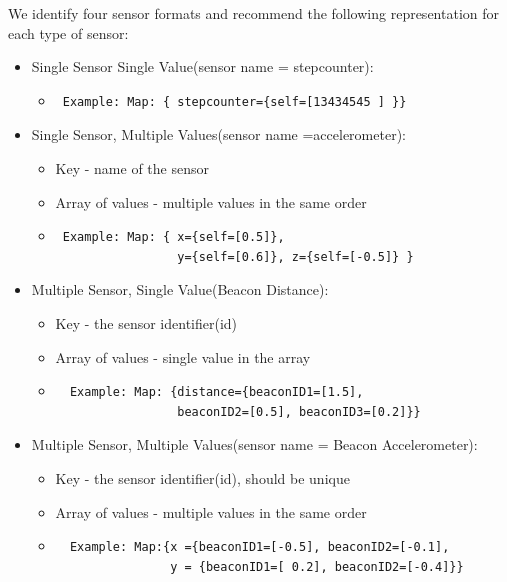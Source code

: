 We identify four sensor formats and recommend the following representation for each type of sensor:
\begin{itemize}
  \item Single Sensor Single Value(sensor name = stepcounter):
  \begin{itemize}
    \item \begin{verbatim} Example: Map: { stepcounter={self=[13434545 ] }} \end{verbatim}                                                              
  \end{itemize}
 
  \item  Single Sensor, Multiple Values(sensor name =accelerometer):
  \begin{itemize}
    \item Key - name of the sensor
    \item Array of values - multiple values in the same order
    \item \begin{verbatim} Example: Map: { x={self=[0.5]},
                 y={self=[0.6]}, z={self=[-0.5]} } \end{verbatim}  
  \end{itemize}

 
  \item Multiple Sensor, Single Value(Beacon Distance):
  \begin{itemize}
    \item Key - the sensor identifier(id)
    \item Array of values - single value in the array
    \item  \begin{verbatim}  Example: Map: {distance={beaconID1=[1.5],
                 beaconID2=[0.5], beaconID3=[0.2]}} \end{verbatim}  
  \end{itemize}

  \item  Multiple Sensor, Multiple Values(sensor name = Beacon Accelerometer):
  \begin{itemize}
    \item Key - the sensor identifier(id), should be unique
    \item Array of values - multiple values in the same order
    \item  \begin{verbatim}  Example: Map:{x ={beaconID1=[-0.5], beaconID2=[-0.1],
                y = {beaconID1=[ 0.2], beaconID2=[-0.4]}} \end{verbatim}  
 \end{itemize}
\end{itemize}

